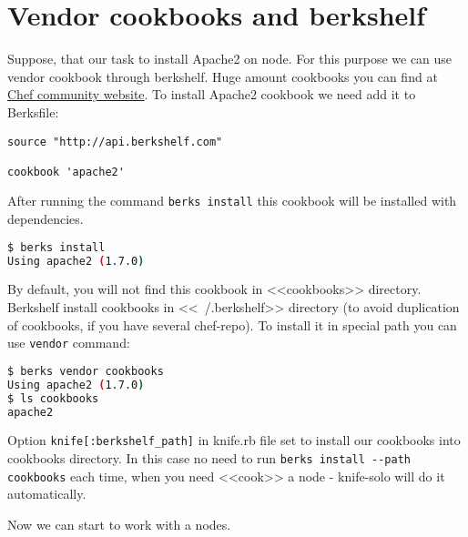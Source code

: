\section{Vendor cookbooks and berkshelf}
\label{sec:solo-berkshelf}

Suppose, that our task to install Apache2 on node. For this purpose we can use vendor cookbook through berkshelf. Huge amount cookbooks you can find at \href{https://supermarket.getchef.com/cookbooks-directory}{Chef community website}. To install Apache2 cookbook we need add it to Berksfile:

\begin{lstlisting}[label=lst:my-cloud-berkshelf1,title=my-cloud/Berksfile]
source "http://api.berkshelf.com"

cookbook 'apache2'
\end{lstlisting}

After running the command \lstinline!berks install! this cookbook will be installed with dependencies.

\begin{lstlisting}[language=Bash,label=lst:my-cloud-berkshelf2]
$ berks install
Using apache2 (1.7.0)
\end{lstlisting}

By default, you will not find this cookbook in <<cookbooks>> directory. Berkshelf install cookbooks in <<~/.berkshelf>> directory (to avoid duplication of cookbooks, if you have several chef-repo). To install it in special path you can use \lstinline!vendor! command:

\begin{lstlisting}[language=Bash,label=lst:my-cloud-berkshelf3]
$ berks vendor cookbooks
Using apache2 (1.7.0)
$ ls cookbooks
apache2
\end{lstlisting}

Option \lstinline!knife[:berkshelf_path]! in knife.rb file set to install our cookbooks into cookbooks directory. In this case no need to run \lstinline!berks install --path cookbooks! each time, when you need <<cook>> a node - knife-solo will do it automatically.

Now we can start to work with a nodes.
